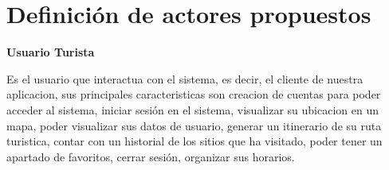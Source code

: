 \documentclass{article}
\begin{document}
\newpage




    
\section{Definición de actores propuestos}
\textbf{Usuario Turista}\par
Es el usuario que interactua con el sistema, es decir, el cliente de nuestra aplicacion, sus principales caracteristicas son creacion de cuentas para poder acceder al sistema, iniciar sesión en el sistema, visualizar su ubicacion en un mapa, poder visualizar sus datos de usuario, generar un itinerario de su ruta turistica, contar con un historial de los sitios que ha visitado, poder tener un apartado de favoritos, cerrar sesión, organizar sus horarios. 





\begin{comment}




\end{comment}







\printindex
\end{document}
